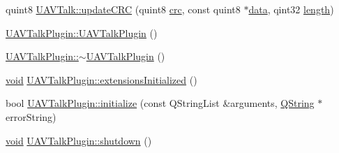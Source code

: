 \begin{DoxyCompactItemize}
\item 
quint8 \hyperlink{group___u_a_v_talk_plugin_gadefd185fb8609e37990694d45282ecd4}{U\-A\-V\-Talk\-::update\-C\-R\-C} (quint8 \hyperlink{uavobjecttemplate_8m_a6a3730e10b2455e9a8b6599785809fce}{crc}, const quint8 $\ast$\hyperlink{glext_8h_a8850df0785e6fbcc2351af3b686b8c7a}{data}, qint32 \hyperlink{glext_8h_a3c8469415bbc83dd1341af15c67f1cef}{length})
\item 
\hyperlink{group___u_a_v_talk_plugin_ga140bdf803c218ccb2a6017a2a6aba95e}{U\-A\-V\-Talk\-Plugin\-::\-U\-A\-V\-Talk\-Plugin} ()
\item 
\hyperlink{group___u_a_v_talk_plugin_gab4102ef2791ea82b9460336b06361158}{U\-A\-V\-Talk\-Plugin\-::$\sim$\-U\-A\-V\-Talk\-Plugin} ()
\item 
\hyperlink{group___u_a_v_objects_plugin_ga444cf2ff3f0ecbe028adce838d373f5c}{void} \hyperlink{group___u_a_v_talk_plugin_ga2b7202eb07a1d037f8e92eeedbc1621e}{U\-A\-V\-Talk\-Plugin\-::extensions\-Initialized} ()
\item 
bool \hyperlink{group___u_a_v_talk_plugin_ga311f58f272717ad544a6ca019a42f821}{U\-A\-V\-Talk\-Plugin\-::initialize} (const Q\-String\-List \&arguments, \hyperlink{group___u_a_v_objects_plugin_gab9d252f49c333c94a72f97ce3105a32d}{Q\-String} $\ast$error\-String)
\item 
\hyperlink{group___u_a_v_objects_plugin_ga444cf2ff3f0ecbe028adce838d373f5c}{void} \hyperlink{group___u_a_v_talk_plugin_ga67b3b23618210b3dfbf43dc1b0fa03b1}{U\-A\-V\-Talk\-Plugin\-::shutdown} ()
\end{DoxyCompactItemize}
